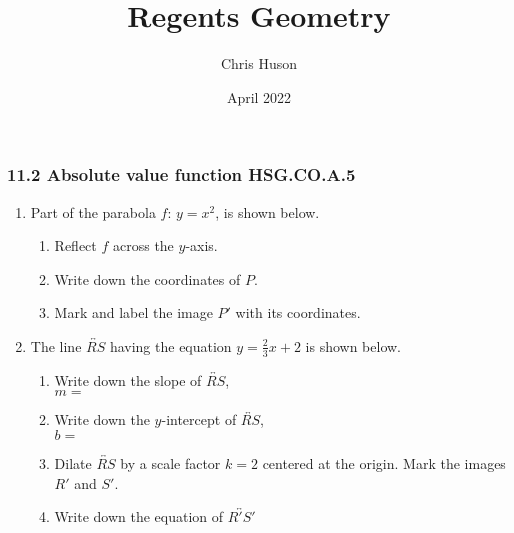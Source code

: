 \documentclass[12pt, twoside]{article}
\title{Regents Geometry}
\author{Chris Huson}
\date{April 2022}
\begin{document}
\subsubsection*{11.2 Absolute value function \hfill HSG.CO.A.5}
\begin{enumerate}
\item Part of the parabola $f$: $y=x^2$, is shown below. 
\begin{multicols}{2}
  \begin{enumerate}
    \item Reflect $f$ across the $y$-axis.
    \item Write down the coordinates of $P$.
    \item Mark and label the image $P'$ with its coordinates. \vspace{2cm}
  \end{enumerate}
  \begin{flushright}
\end{flushright}
\end{multicols}

\item The line $\overleftrightarrow{RS}$ having the equation $\displaystyle y=\frac{2}{3}x+2$ is shown below.
\begin{multicols}{2}
  \begin{enumerate}
    \item Write down the slope of $\overleftrightarrow{RS}$,\\[0.25cm] $m=$
    \item Write down the $y$-intercept of $\overleftrightarrow{RS}$,\\[0.25cm] $b=$
    \item Dilate $\overleftrightarrow{RS}$ by a scale factor $k=2$ centered at the origin. Mark the images $R'$ and $S'$.
    \item Write down the equation of $\overleftrightarrow{R'S'}$
  \end{enumerate}
  \begin{flushright}
  \end{flushright}
\end{multicols}%


\end{enumerate}
\end{document}
